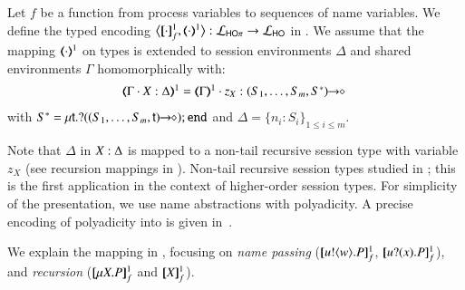 \begin{definition}
\label{d:enc:hopitoho}
Let $f$ be a function from process variables to sequences of name variables.
%
We define the typed encoding 
$\enco{\map{\cdot}^{1}_f, \mapt{\cdot}^{1} %
}: \tyl{L}_{\HOp} \to \tyl{L}_{\HO}$ in 
. 
We assume that the mapping $(\!\!\langle\cdot\rangle\!\!)^{1}$ on types is extended to 
session environments $\Delta$
and
shared environments $\Gamma$ homomorphically with: 
\[
	\begin{array}{l}
		\tmap{\Gamma \cat \varp{X}:\Delta}{1}  =  \tmap{\Gamma}{1} \cat z_X:\shot{(S_1,\ldots,S_m,S^*)} \ 
	\end{array}
\]
with
$S^* = \mu\mathsf{t}.? ((S_1,\ldots,S_m,\mathsf{t})\!\! \rightarrow\!\! \diamond) ; \mathtt{end}$
and $\Delta = \{n_i:S_i\}_{1\leq i\leq m}$. 
\end{definition}

\smallskip 
\noi Note that $\Delta$ in $X:\Delta$ is mapped to a non-tail
recursive session type with variable $z_X$ (see recursion mappings in ).
Non-tail
recursive session types  studied in
\cite{DBLP:journals/corr/abs-1202-2086,TGC14};
this is the first application in the
context of higher-order session types.
For simplicity of the presentation, %
we use name abstractions with polyadicity.
A precise encoding of polyadicity into \HO is given in~.

We explain the mapping in , focusing 
on {\em name passing} ($[\!\![u ! \langle w \rangle . P]\!\!]^1_f$, $[\!\![u ? (x) . P]\!\!]^1_f$),  and  
{\em recursion} ($[\!\![\mu X. P]\!\!]^1_f$ and $[\!\![X]\!\!]^1_f$). 

